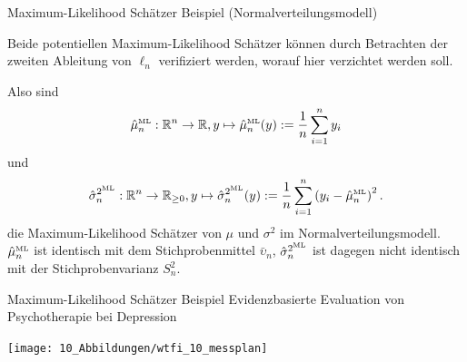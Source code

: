 \documentclass[
  8pt,
  ignorenonframetext,
]{beamer}
\newcommand{\ups} {\upsilon}
\begin{document}
\begin{frame}{Maximum-Likelihood Schätzer}
\protect\hypertarget{maximum-likelihood-schuxe4tzer-10}{}
Beispiel (Normalverteilungsmodell)

\vspace{2mm}

\small

Beide potentiellen Maximum-Likelihood Schätzer können durch Betrachten
der zweiten Ableitung von \(\ell_n\) verifiziert werden, worauf hier
verzichtet werden soll.

Also sind \begin{equation}
\hat{\mu}_{n}^{\mbox{\tiny ML}} :
\mathbb{R}^n \to \mathbb{R}, y \mapsto \hat{\mu}_{n}^{\mbox{\tiny ML}}(y)
:= \frac{1}{n}\sum_{i=1}^n y_i
\end{equation} und \begin{equation}
\hat{\sigma}_n^{2^{\mbox{\tiny ML}}} :
\mathbb{R}^n \to \mathbb{R}_{\ge 0},
y \mapsto \hat{\sigma}_n^{2^{\mbox{\tiny ML}}}(y)
:= \frac{1}{n}\sum_{i=1}^n \left(y_i - \hat{\mu}_{n}^{\mbox{\tiny ML}}\right)^2.
\end{equation} die Maximum-Likelihood Schätzer von \(\mu\) und
\(\sigma^2\) im Normalverteilungsmodell.
\(\hat{\mu}_{n}^{\mbox{\tiny ML}}\) ist identisch mit dem
Stichprobenmittel \(\bar{\ups}_n\),
\(\hat{\sigma}_{n}^{2^{\mbox{\tiny ML}}}\) ist dagegen nicht identisch
mit der Stichprobenvarianz \(S^2_n\).
\end{frame}

\begin{frame}[t]{Maximum-Likelihood Schätzer}
\protect\hypertarget{maximum-likelihood-schuxe4tzer-11}{}
Beispiel \textbar{} Evidenzbasierte Evaluation von Psychotherapie bei
Depression

\begin{center}\texttt{[image: 10\_Abbildungen/wtfi\_10\_messplan]} \end{center}
\end{frame}
\end{document}
